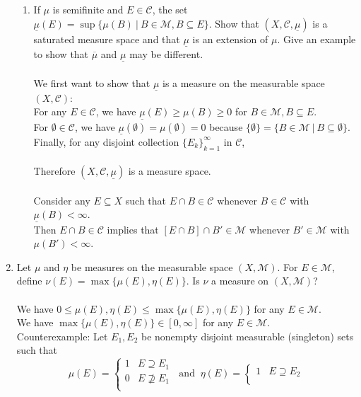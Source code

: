 \begin{enumerate}
\begin{enumerate}[label=(\roman*),align=left]
		\item If $\mu$ is semifinite and $E\in\mathcal{C}$, the set $\underline\mu(E)=\sup\{\mu(B)\ |\ B\in\mathcal{M},B\subseteq E\}$.
		Show that $(X,\mathcal{C},\underline\mu)$ is a saturated measure space and that $\underline\mu$ is an extension of $\mu$.
		Give an example to show that $\overline\mu$ and $\underline\mu$ may be different.\\
		\\We first want to show that $\underline\mu$ is a measure on the measurable space $(X,\mathcal{C})$:
		\\For any $E\in\mathcal{C}$, we have $\underline\mu(E)\ge\mu(B)\ge0$ for $B\in\mathcal{M},B\subseteq E$.
		\\For $\emptyset\in\mathcal{C}$, we have $\underline\mu(\emptyset)=\mu(\emptyset)=0$ because $\{\emptyset\}=\{B\in\mathcal{M}\ |\ B\subseteq\emptyset\}$.
		\\Finally, for any disjoint collection $\{E_k\}_{k=1}^\infty$ in $\mathcal{C}$,\\
		\\Therefore $(X,\mathcal{C},\underline\mu)$ is a measure space.\\
		\\Consider any $E\subseteq X$ such that $E\cap B\in\mathcal{C}$ whenever $B\in\mathcal{C}$ with $\underline\mu(B)<\infty$.
		\\Then $E\cap B\in\mathcal{C}$ implies that $[E\cap B]\cap B'\in\mathcal{M}$ whenever $B'\in\mathcal{M}$ with $\mu(B')<\infty$.
	\end{enumerate}
	\item Let $\mu$ and $\eta$ be measures on the measurable space $(X,\mathcal{M})$.
	For $E\in\mathcal{M}$, define $\nu(E)=\max\{\mu(E),\eta(E)\}$. Is $\nu$ a measure on $(X,\mathcal{M})$?\\
	\\We have $0\le\mu(E),\eta(E)\le\max\{\mu(E),\eta(E)\}$ for any $E\in\mathcal{M}$.
	\\We have $\max\{\mu(E),\eta(E)\}\in[0,\infty]$ for any $E\in\mathcal{M}$.
	\\Counterexample:
	Let $E_1,E_2$ be nonempty disjoint measurable (singleton) sets such that
	\[
		\mu(E)=
		\begin{cases}
			1&E\supseteq E_1\\
			0&E\not\supseteq E_1\\
		\end{cases}
		\ \text{ and }\ \eta(E)=
		\begin{cases}
			1&E\supseteq E_2\\

\end{cases}\]
\end{enumerate}
